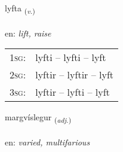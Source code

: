 \documentclass[frontgrid, backgrid]{flacards}\usepackage[]{graphicx}\usepackage[]{color}
\begin{document}
\renewcommand{\flhead}{\vskip5pt \fboxsep=0pt {\small\bfseries\footnotesize Sagnorð | Verb}}
\renewcommand{\fcfoot}{\vskip5pt \fboxsep=0pt \hspace{2pt}{\small\bfseries\footnotesize 2K}}

\renewcommand{\blhead}{\vskip5pt {\small\bfseries\footnotesize Sagnorð | Verb }}
\renewcommand{\bcfoot}{\vskip5pt \hspace{2pt}{\small\bfseries\footnotesize 2K}}


{lyfta \small{\textsubscript{(\textit{v.})}} \\[1ex] %
\textphonetic{[lɪfta]} \\
en: \emph{lift, raise} \\  [2ex]
\renewcommand*{\arraystretch}{0.8}
\begin{tabular}{p{1cm}l}
\textsc{1sg}: & lyfti -- lyfti -- lyft \\ 
\textsc{2sg}: & lyftir -- lyftir -- lyft \\ 
\textsc{3sg}: & lyftir -- lyfti -- lyft \\ 
\end{tabular}
}

\renewcommand{\flhead}{\vskip5pt \fboxsep=0pt {\small\bfseries\footnotesize Lýsingarorð | Adjective}}
\renewcommand{\fcfoot}{\vskip5pt \fboxsep=0pt \hspace{2pt}{\small\bfseries\footnotesize 2K}}

\renewcommand{\blhead}{\vskip5pt {\small\bfseries\footnotesize Lýsingarorð | Adjective }}
\renewcommand{\bcfoot}{\vskip5pt \hspace{2pt}{\small\bfseries\footnotesize 2K}}


{margvíslegur \small{\textsubscript{(\textit{adj.})}} \\[1ex] %
\textphonetic{[markvistlɛɣʏr]} \\
en: \emph{varied, multifarious} \\  [2ex]
\renewcommand*{\arraystretch}{0.8}
}
\end{document}
